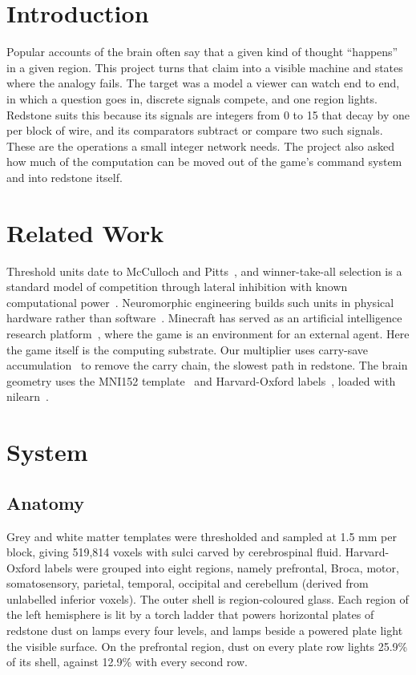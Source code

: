 \documentclass[conference]{IEEEtran}
\begin{document}
\section{Introduction}
Popular accounts of the brain often say that a given kind of thought ``happens'' in a given region. This project turns that claim into a visible machine and states where the analogy fails. The target was a model a viewer can watch end to end, in which a question goes in, discrete signals compete, and one region lights. Redstone suits this because its signals are integers from 0 to 15 that decay by one per block of wire, and its comparators subtract or compare two such signals. These are the operations a small integer network needs. The project also asked how much of the computation can be moved out of the game's command system and into redstone itself.

\section{Related Work}
Threshold units date to McCulloch and Pitts~\cite{mp}, and winner-take-all selection is a standard model of competition through lateral inhibition with known computational power~\cite{maass}. Neuromorphic engineering builds such units in physical hardware rather than software~\cite{mead}. Minecraft has served as an artificial intelligence research platform~\cite{malmo}, where the game is an environment for an external agent. Here the game itself is the computing substrate. Our multiplier uses carry-save accumulation~\cite{wallace} to remove the carry chain, the slowest path in redstone. The brain geometry uses the MNI152 template~\cite{fonov} and Harvard-Oxford labels~\cite{desikan}, loaded with nilearn~\cite{nilearn}.

\section{System}
\subsection{Anatomy}
Grey and white matter templates were thresholded and sampled at 1.5 mm per block, giving 519,814 voxels with sulci carved by cerebrospinal fluid. Harvard-Oxford labels were grouped into eight regions, namely prefrontal, Broca, motor, somatosensory, parietal, temporal, occipital and cerebellum (derived from unlabelled inferior voxels). The outer shell is region-coloured glass. Each region of the left hemisphere is lit by a torch ladder that powers horizontal plates of redstone dust on lamps every four levels, and lamps beside a powered plate light the visible surface. On the prefrontal region, dust on every plate row lights 25.9\% of its shell, against 12.9\% with every second row.
\end{document}
